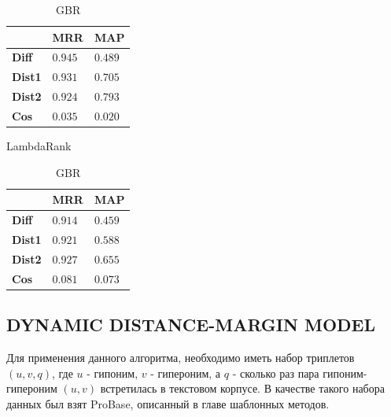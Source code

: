 \begin{table}[!htb]

\begin{minipage}{.5\textwidth}
\centering
\begin{tabular}{|l|l|l|}
\hline
 & \textbf{MRR} & \textbf{MAP} \\

\hline
\textbf{Diff} & $0.945$ & $0.489$\\

\hline
\textbf{Dist1} & $0.931$ & $0.705$\\

\hline
\textbf{Dist2} & $0.924$ & $0.793$\\

\hline
\textbf{Cos} & $0.035$ & $0.020$\\

\hline
\end{tabular}
\caption{LambdaRank}
\label{tabular:LambdaRank2}
\end{minipage}%
\begin{minipage}{.5\textwidth}
\centering
\begin{tabular}{|l|l|l|}
\hline
 & \textbf{MRR} & \textbf{MAP} \\

\hline
\textbf{Diff} & $0.914$ & $0.459$\\

\hline
\textbf{Dist1} & $0.921$ & $0.588$\\

\hline
\textbf{Dist2} & $0.927$ & $0.655$\\

\hline
\textbf{Cos} & $0.081$ & $0.073$\\

\hline
\end{tabular}
\caption{GBR}
\label{tabular:GBR2}
\end{minipage}

\end{table}



\subsection{DYNAMIC DISTANCE-MARGIN MODEL}

Для применения данного алгоритма, необходимо иметь набор триплетов $(u, v, q)$, где $u$ - гипоним, $v$ - гипероним, а $q$ - сколько раз пара гипоним-гипероним $(u, v)$ встретилась в текстовом корпусе. В качестве такого набора данных был взят ProBase, описанный в главе
шаблонных методов.

